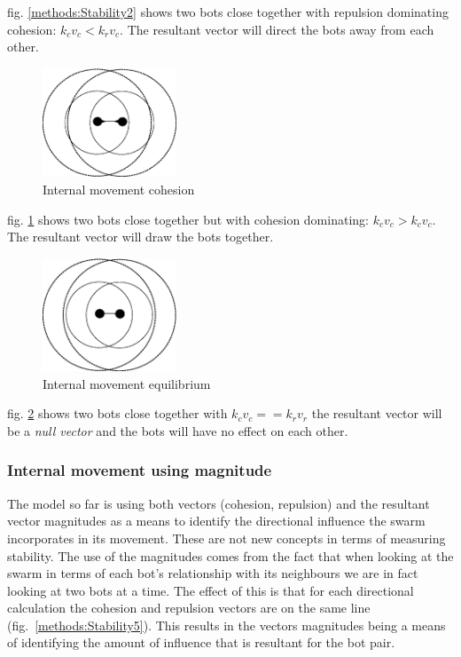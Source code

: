 \documentclass[10pt,journal,letterpaper,twoside]{IEEEtran}
\newcommand{\Stability}{Internal movement}
\newcommand{\Fig}{fig.}
\begin{document}
\Fig{} \ref{methods:Stability2} shows two bots close together with repulsion dominating cohesion: $k_cv_c < k_rv_c$. The resultant vector will direct the bots away from each other.

\begin{figure}[H]
\begin{center}
\includegraphics[width=4cm]{figures/Stability3}
\end{center}
\caption{\Stability{} cohesion} \label{methods:Stability3}
\end{figure}

\Fig{} \ref{methods:Stability3} shows two bots close together but with cohesion dominating: $k_cv_c > k_cv_c$. The resultant vector will draw the bots together.

\begin{figure}[H]
\begin{center}
\includegraphics[width=4cm]{figures/Stability4}
\end{center}
\caption{\Stability{} equilibrium} \label{methods:Stability4}
\end{figure}

\Fig{} \ref{methods:Stability4} shows two bots close together with $k_cv_c == k_rv_r$ the resultant vector will be a \textit{null vector} and the bots will have no effect on each other.

\subsubsection{\Stability{} using magnitude}\label{Section:StabilityMagnatude}

The model so far is using both vectors (cohesion, repulsion) and the resultant vector magnitudes as a means to identify the directional influence the swarm incorporates in its movement. These are not new concepts in terms of measuring stability. The use of the magnitudes comes from the fact that when looking at the swarm in terms of each bot's relationship with its neighbours we are in fact looking at two bots at a time. The effect of this is that for each directional calculation the cohesion and repulsion vectors are on the same line (\Fig{}~\ref{methods:Stability5}). This results in the vectors magnitudes being a means of identifying the amount of influence that is resultant for the bot pair.
\end{document}
